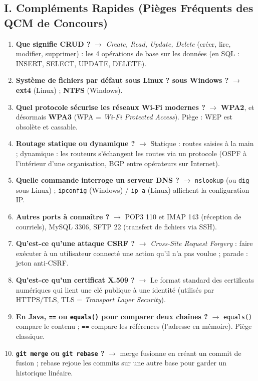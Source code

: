 \subsection*{I. Compléments Rapides (Pièges Fréquents des QCM de Concours)}
\begin{enumerate}[leftmargin=*]
    \item \textbf{Que signifie CRUD ?} $\rightarrow$ \textit{Create, Read, Update, Delete} (créer, lire, modifier, supprimer) : les 4 opérations de base sur les données (en SQL : INSERT, SELECT, UPDATE, DELETE).
    \item \textbf{Système de fichiers par défaut sous Linux ? sous Windows ?} $\rightarrow$ \textbf{ext4} (Linux) ; \textbf{NTFS} (Windows).
    \item \textbf{Quel protocole sécurise les réseaux Wi-Fi modernes ?} $\rightarrow$ \textbf{WPA2}, et désormais \textbf{WPA3} (WPA = \textit{Wi-Fi Protected Access}). Piège : WEP est obsolète et cassable.
    \item \textbf{Routage statique ou dynamique ?} $\rightarrow$ Statique : routes saisies à la main ; dynamique : les routeurs s'échangent les routes via un protocole (OSPF à l'intérieur d'une organisation, BGP entre opérateurs sur Internet).
    \item \textbf{Quelle commande interroge un serveur DNS ?} $\rightarrow$ \texttt{nslookup} (ou \texttt{dig} sous Linux) ; \texttt{ipconfig} (Windows) / \texttt{ip a} (Linux) affichent la configuration IP.
    \item \textbf{Autres ports à connaître ?} $\rightarrow$ POP3 110 et IMAP 143 (réception de courriels), MySQL 3306, SFTP 22 (transfert de fichiers via SSH).
    \item \textbf{Qu'est-ce qu'une attaque CSRF ?} $\rightarrow$ \textit{Cross-Site Request Forgery} : faire exécuter à un utilisateur connecté une action qu'il n'a pas voulue ; parade : jeton anti-CSRF.
    \item \textbf{Qu'est-ce qu'un certificat X.509 ?} $\rightarrow$ Le format standard des certificats numériques qui lient une clé publique à une identité (utilisés par HTTPS/TLS, TLS = \textit{Transport Layer Security}).
    \item \textbf{En Java, \texttt{==} ou \texttt{equals()} pour comparer deux chaînes ?} $\rightarrow$ \texttt{equals()} compare le contenu ; \texttt{==} compare les références (l'adresse en mémoire). Piège classique.
    \item \textbf{\texttt{git merge} ou \texttt{git rebase} ?} $\rightarrow$ merge fusionne en créant un commit de fusion ; rebase rejoue les commits sur une autre base pour garder un historique linéaire.

\end{enumerate}
